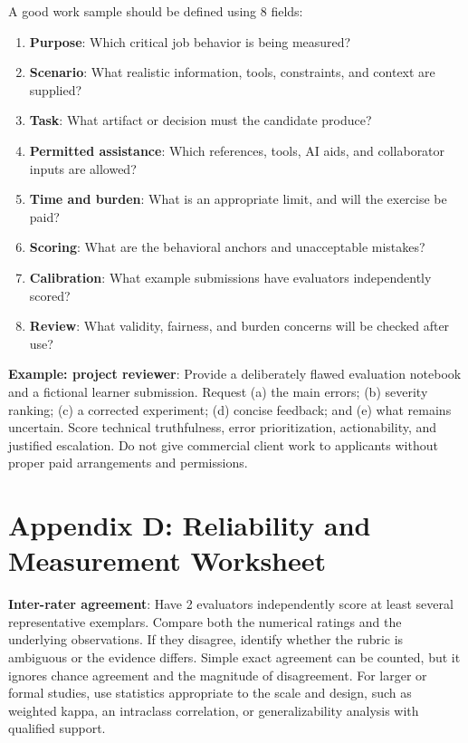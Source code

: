 A good work sample should be defined using 8 fields:
\begin{enumerate}[leftmargin=*]
\item \textbf{Purpose}: Which critical job behavior is being measured?
\item \textbf{Scenario}: What realistic information, tools, constraints, and context are supplied?
\item \textbf{Task}: What artifact or decision must the candidate produce?
\item \textbf{Permitted assistance}: Which references, tools, AI aids, and collaborator inputs are allowed?
\item \textbf{Time and burden}: What is an appropriate limit, and will the exercise be paid?
\item \textbf{Scoring}: What are the behavioral anchors and unacceptable mistakes?
\item \textbf{Calibration}: What example submissions have evaluators independently scored?
\item \textbf{Review}: What validity, fairness, and burden concerns will be checked after use?
\end{enumerate}

\textbf{Example: project reviewer}: Provide a deliberately flawed evaluation notebook and a fictional learner submission. Request (a) the main errors; (b) severity ranking; (c) a corrected experiment; (d) concise feedback; and (e) what remains uncertain. Score technical truthfulness, error prioritization, actionability, and justified escalation. Do not give commercial client work to applicants without proper paid arrangements and permissions.

\section*{Appendix D: Reliability and Measurement Worksheet}

\textbf{Inter-rater agreement}: Have 2 evaluators independently score at least several representative exemplars. Compare both the numerical ratings and the underlying observations. If they disagree, identify whether the rubric is ambiguous or the evidence differs. Simple exact agreement can be counted, but it ignores chance agreement and the magnitude of disagreement. For larger or formal studies, use statistics appropriate to the scale and design, such as weighted kappa, an intraclass correlation, or generalizability analysis with qualified support.

